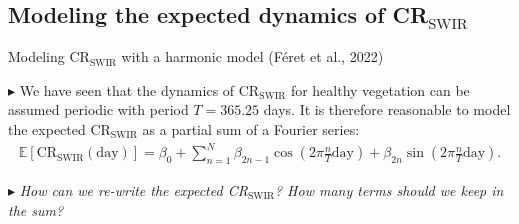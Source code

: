 \documentclass[aspectratio=169, 9pt]{beamer}
\begin{document}
\subsection{Modeling the expected dynamics of CR$_{\text{SWIR}}$}
\begin{frame}{Modeling CR$_{\text{SWIR}}$ with a harmonic model (Féret et al., 2022)}

$\blacktriangleright$ We have seen that the dynamics of CR$_{\text{SWIR}}$ for healthy vegetation can be assumed periodic with period $T = 365.25$ days. It is therefore reasonable to model the expected CR$_{\text{SWIR}}$ as a partial sum of a Fourier series:
\begin{align*}
	\mathbb{E}[\text{CR}_{\text{SWIR}}(\text{day})] = \beta_0 + \sum_{n=1}^N \beta_{2n-1} \cos\!\left(2 \pi \frac{n}{T}\text{day}\right) +  \beta_{2n} \sin\!\left(2 \pi \frac{n}{T}\text{day}\right).
\end{align*}



$\blacktriangleright$ \textit{How can we re-write the expected CR$_{\text{SWIR}}$? How many terms should we keep in the sum?}

%

\end{frame}
\end{document}
